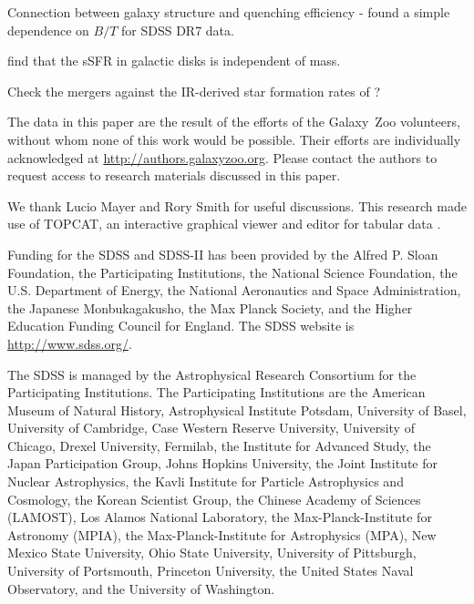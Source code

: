 \documentclass{emulateapj}
\begin{document}
Connection between galaxy structure and quenching efficiency - \citet{oma14} found a simple dependence on $B/T$ for SDSS DR7 data. 

\citet{abr14} find that the sSFR in galactic disks is independent of mass. 

Check the mergers against the IR-derived star formation rates of \citet{jar13}?


\acknowledgments

The data in this paper are the result of the efforts of the Galaxy~Zoo volunteers, without whom none of this work would be possible. Their efforts are individually acknowledged at \url{http://authors.galaxyzoo.org}. Please contact the authors to request access to research materials discussed in this paper. 

We thank Lucio Mayer and Rory Smith for useful discussions. This research made use of TOPCAT, an interactive graphical viewer and editor for tabular data \citep{tay05}. 

Funding for the SDSS and SDSS-II has been provided by the Alfred P. Sloan Foundation, the Participating Institutions, the National Science Foundation, the U.S. Department of Energy, the National Aeronautics and Space Administration, the Japanese Monbukagakusho, the Max Planck Society, and the Higher Education Funding Council for England. The SDSS website is \url{http://www.sdss.org/}.

The SDSS is managed by the Astrophysical Research Consortium for the Participating Institutions. The Participating Institutions are the American Museum of Natural History, Astrophysical Institute Potsdam, University of Basel, University of Cambridge, Case Western Reserve University, University of Chicago, Drexel University, Fermilab, the Institute for Advanced Study, the Japan Participation Group, Johns Hopkins University, the Joint Institute for Nuclear Astrophysics, the Kavli Institute for Particle Astrophysics and Cosmology, the Korean Scientist Group, the Chinese Academy of Sciences (LAMOST), Los Alamos National Laboratory, the Max-Planck-Institute for Astronomy (MPIA), the Max-Planck-Institute for Astrophysics (MPA), New Mexico State University, Ohio State University, University of Pittsburgh, University of Portsmouth, Princeton University, the United States Naval Observatory, and the University of Washington.

\clearpage



\end{document}
